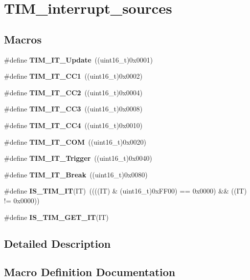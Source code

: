 \section{T\+I\+M\+\_\+interrupt\+\_\+sources}
\label{group__TIM__interrupt__sources}
\subsection*{Macros}
\begin{DoxyCompactItemize}
\item 
\#define \textbf{ T\+I\+M\+\_\+\+I\+T\+\_\+\+Update}~((uint16\+\_\+t)0x0001)
\item 
\#define \textbf{ T\+I\+M\+\_\+\+I\+T\+\_\+\+C\+C1}~((uint16\+\_\+t)0x0002)
\item 
\#define \textbf{ T\+I\+M\+\_\+\+I\+T\+\_\+\+C\+C2}~((uint16\+\_\+t)0x0004)
\item 
\#define \textbf{ T\+I\+M\+\_\+\+I\+T\+\_\+\+C\+C3}~((uint16\+\_\+t)0x0008)
\item 
\#define \textbf{ T\+I\+M\+\_\+\+I\+T\+\_\+\+C\+C4}~((uint16\+\_\+t)0x0010)
\item 
\#define \textbf{ T\+I\+M\+\_\+\+I\+T\+\_\+\+C\+OM}~((uint16\+\_\+t)0x0020)
\item 
\#define \textbf{ T\+I\+M\+\_\+\+I\+T\+\_\+\+Trigger}~((uint16\+\_\+t)0x0040)
\item 
\#define \textbf{ T\+I\+M\+\_\+\+I\+T\+\_\+\+Break}~((uint16\+\_\+t)0x0080)
\item 
\#define \textbf{ I\+S\+\_\+\+T\+I\+M\+\_\+\+IT}(IT)~((((IT) \& (uint16\+\_\+t)0x\+F\+F00) == 0x0000) \&\& ((\+I\+T) != 0x0000))
\item 
\#define \textbf{ I\+S\+\_\+\+T\+I\+M\+\_\+\+G\+E\+T\+\_\+\+IT}(IT)
\end{DoxyCompactItemize}


\subsection{Detailed Description}


\subsection{Macro Definition Documentation}
\mbox{\label{group__TIM__interrupt__sources_ga38e9d740c8d4ed8fcaced73816c124e6}} 
